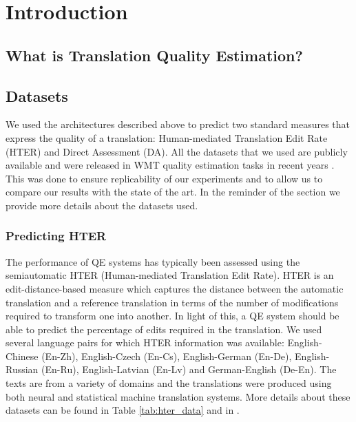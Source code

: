 \chapter{\label{cha:qe_introduction}Introduction}

\section{What is Translation Quality Estimation?}

\section{Datasets}
\label{sec:datasets}

We used the architectures described above to predict two standard measures that express the quality of a translation: Human-mediated Translation Edit Rate (HTER) and Direct Assessment (DA).  All the datasets that we used are publicly available and were released in WMT quality estimation tasks in recent years \cite{specia-etal-2018-findings,fonseca-etal-2019-findings,specia-etal-2020-findings-wmt}. This was done to ensure replicability of our experiments and to allow us to compare our results with the state of the art. In the reminder of the section we provide more details about the datasets used. 

\subsection{Predicting HTER}
The performance of QE systems has typically been assessed using the semiautomatic HTER (Human-mediated Translation Edit Rate). HTER is an edit-distance-based measure which captures the distance between the automatic translation and a reference translation in terms of the number of modifications required to transform one into another. In light of this, a QE system should be able to predict the percentage of edits required in the translation. We used several language pairs for which HTER information was available: English-Chinese (En-Zh), English-Czech (En-Cs), English-German (En-De), English-Russian (En-Ru), English-Latvian (En-Lv) and German-English (De-En). The texts are from a variety of domains and the translations were produced using both neural and statistical machine translation systems. More details about these datasets can be found in Table \ref{tab:hter_data} and in \cite{specia-etal-2018-findings,fonseca-etal-2019-findings,specia-etal-2020-findings-wmt}.

